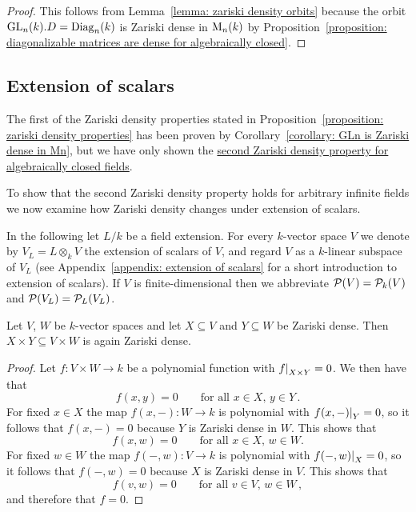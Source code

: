 \begin{proof}
  This follows from Lemma~\ref{lemma: zariski density orbits} because the orbit $\operatorname{GL}_n(k).D = \operatorname{Diag}_n(k)$ is Zariski dense in $\operatorname{M}_n(k)$ by Proposition~\ref{proposition: diagonalizable matrices are dense for algebraically closed}.
\end{proof}





\subsection*{Extension of scalars}


\begin{fluff}
  The first of the Zariski density properties stated in Proposition~\ref{proposition: zariski density properties} has been proven by Corollary~\ref{corollary: GLn is Zariski dense in Mn}, but we have only shown the \hyperref[corollary: second Zariski density property for algebraically closed fields]{second Zariski density property for algebraically closed fields}.
  
  To show that the second Zariski density property holds for arbitrary infinite fields we now examine how Zariski density changes under extension of scalars.
\end{fluff}


\begin{conventions}
  In the following let $L/k$ be a field extension.
  For every $k$-vector space $V$ we denote by $V_L = L \otimes_k V$ the extension of scalars of $V$, and regard $V$ as a $k$-linear subspace of $V_L$ (see Appendix~\ref{appendix: extension of scalars} for a short introduction to extension of scalars).
  If $V$ is finite-dimensional then we abbreviate $\mathcal{P}(V) = \mathcal{P}_k(V)$ and $\mathcal{P}(V_L) = \mathcal{P}_L(V_L)$.
\end{conventions}


\begin{lemma}
  \label{lemma: product of Zariski dense is again Zariski dense}
  Let $V$, $W$ be $k$-vector spaces and let $X \subseteq V$ and $Y \subseteq W$ be Zariski dense.
  Then $X \times Y \subseteq V \times W$ is again Zariski dense.
\end{lemma}


\begin{proof}
  Let $f \colon V \times W \to k$ be a polynomial function with $\restrict{f}{X \times Y} = 0$.
  We then have that
  \[
      f(x,y)
    = 0
    \qquad
    \text{for all $x \in X$, $y \in Y$} \,.
  \]
  For fixed $x \in X$ the map $f(x,-) \colon W \to k$ is polynomial with $\restrict{f(x,-)}{Y} = 0$, so it follows that $f(x,-) = 0$ because $Y$ is Zariski dense in $W$.
  This shows that
  \[
      f(x,w)
    = 0
    \qquad
    \text{for all $x \in X$, $w \in W$}.
  \]
  For fixed $w \in W$ the map $f(-,w) \colon V \to k$ is polynomial with $\restrict{f(-,w)}{X} = 0$, so it follows that $f(-,w) = 0$ because $X$ is Zariski dense in $V$.
  This shows that
  \[
      f(v,w)
    = 0
    \qquad
    \text{for all $v \in V$, $w \in W$} \,,
  \]
  and therefore that $f = 0$.
\end{proof}


